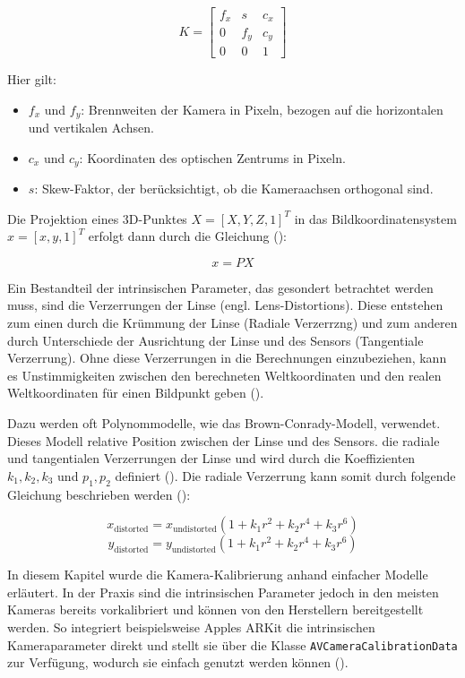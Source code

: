 \[
K = 
\begin{bmatrix}
f_x & s & c_x \\
0 & f_y & c_y \\
0 & 0 & 1
\end{bmatrix}
\]

Hier gilt:

\begin{itemize}
    \item \( f_x \) und \( f_y \): Brennweiten der Kamera in Pixeln, bezogen auf die horizontalen und vertikalen Achsen.
    \item \( c_x \) und \( c_y \): Koordinaten des optischen Zentrums in Pixeln.
    \item \( s \): Skew-Faktor, der berücksichtigt, ob die Kameraachsen orthogonal sind.
\end{itemize}

Die Projektion eines 3D-Punktes \( X = [X, Y, Z, 1]^T \) in das Bildkoordinatensystem \( x = [x, y, 1]^T \) erfolgt dann durch die Gleichung (\cite{mw2024calibration}):

\[
x = PX
\]

Ein Bestandteil der intrinsischen Parameter, das gesondert betrachtet werden muss, sind die Verzerrungen der Linse (engl. Lens-Distortions). Diese entstehen zum einen durch die Krümmung der Linse (Radiale Verzerrzng) und zum anderen durch Unterschiede der Ausrichtung der Linse und des Sensors (Tangentiale Verzerrung). Ohne diese Verzerrungen in die Berechnungen einzubeziehen, kann es Unstimmigkeiten zwischen den berechneten Weltkoordinaten und den realen Weltkoordinaten für einen Bildpunkt geben (\cite{mw2024calibration, szeliski2022computerVision}).

Dazu werden oft Polynommodelle, wie das Brown-Conrady-Modell, verwendet. Dieses Modell relative Position zwischen der Linse und des Sensors. die radiale und tangentialen Verzerrungen der Linse und wird durch die Koeffizienten \( k_1, k_2, k_3 \) und \( p_1, p_2 \) definiert (\cite{brown1966distortion}). Die radiale Verzerrung kann somit durch folgende Gleichung beschrieben werden (\cite{mw2024calibration, szeliski2022computerVision}):

\[
x_{\text{distorted}}   
=
x_{\text{undistorted}}
\left( 1 + k_1 r^2 + k_2 r^4 + k_3 r^6 \right)
\]
\[
y_{\text{distorted}}   
=
y_{\text{undistorted}}
\left( 1 + k_1 r^2 + k_2 r^4 + k_3 r^6 \right)
\]

In diesem Kapitel wurde die Kamera-Kalibrierung anhand einfacher Modelle erläutert. In der Praxis sind die intrinsischen Parameter jedoch in den meisten Kameras bereits vorkalibriert und können von den Herstellern bereitgestellt werden. So integriert beispielsweise Apples ARKit die intrinsischen Kameraparameter direkt und stellt sie über die Klasse \texttt{AVCameraCalibrationData} zur Verfügung, wodurch sie einfach genutzt werden können (\cite{appledevdoc}).

